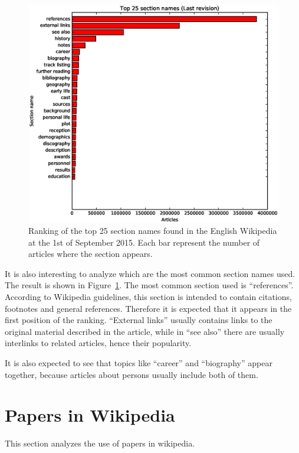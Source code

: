 \begin{figure}[h]
\centering
\includegraphics[keepaspectratio=true, width=\textwidth]{assets/section_names_last_top_25}
\caption{Ranking of the top 25 section names found in the English Wikipedia at the 1st of September 2015.
Each bar represent the number of articles where the section appears.}
\label{fig:section_names_last_top_25}
\end{figure}

It is also interesting to analyze which are the most common section names used.
The result is shown in Figure~\ref{fig:section_names_last_top_25}.
The most common section used is ``references''.
According to Wikipedia guidelines, this section is intended to contain citations, footnotes and general references.
Therefore it is expected that it appears in the first position of the ranking.
``External links'' usually contains links to the original material described in the article, while in ``see also'' there are usually interlinks to related articles, hence their popularity.

It is also expected to see that topics like ``career'' and ``biography'' appear together, because articles about persons usually include both of them.


\section{Papers in Wikipedia}
This section analyzes the use of papers in wikipedia.

